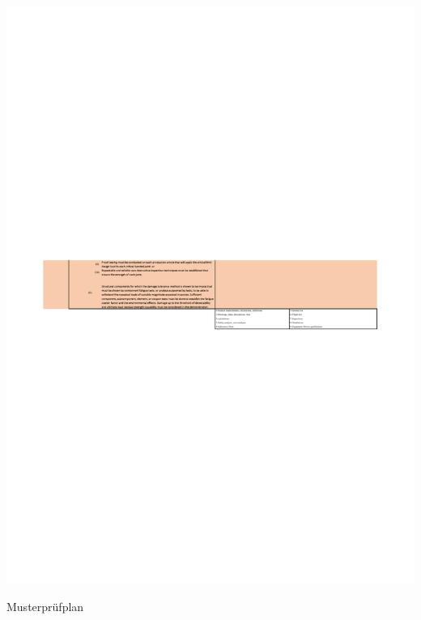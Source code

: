 \begin{table}[H]
\centering
\includegraphics[width=1.0\textwidth, trim={19mm 19mm 19mm 19mm}, clip]{bilder/Tabellen/MPP_Konstruktion_11.pdf}
\caption{Musterprüfplan} 
\label{tab:Musterprüfplan}
\end{table}


\section{}\label{}


